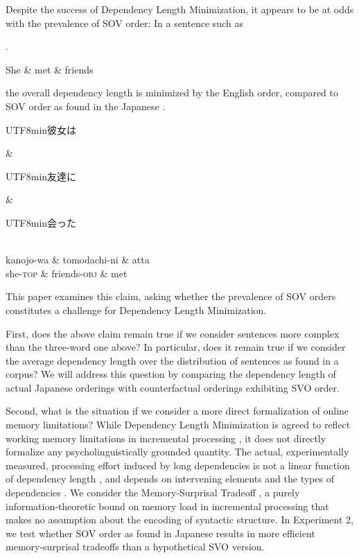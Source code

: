 \documentclass[11pt,a4paper]{article}
\newcommand{\japanese}[1]{\begin{CJK}{UTF8}{min}#1\end{CJK}}
\begin{document}
Despite the success of Dependency Length Minimization, it appears to be at odds with the prevalence of SOV order: In a sentence such as

\ex.
\begin{dependency}[theme = simple]
   \begin{deptext}[column sep=1em]
          She \& met \& friends  \\
   \end{deptext}
\end{dependency}

the overall dependency length is minimized by the English order, compared to SOV order as found in the Japanese
\ex.
\begin{dependency}[theme = simple]
   \begin{deptext}[column sep=1em]
          \japanese{彼女は} \& \japanese{友達に} \& \japanese{会った}  \\
          kanojo-wa \& tomodachi-ni \& atta \\ 
          she-\textsc{top} \& friends-\textsc{obj} \& met \\
   \end{deptext}
\end{dependency}


This paper examines this claim, asking whether the prevalence of SOV orders constitutes a challenge for Dependency Length Minimization.

First, does the above claim remain true if we consider sentences more complex than the three-word one above?
In particular, does it remain true if we consider the average dependency length over the distribution of sentences as found in a corpus?
We will address this question by comparing the dependency length of actual Japanese orderings with counterfactual orderings exhibiting SVO order.


Second, what is the situation if we consider a more direct formalization of online memory limitations?
While Dependency Length Minimization is agreed to reflect working memory limitations in incremental processing \citep{hawkins1994performance, futrell2015largescale, temperley2018minimizing}, it does not directly formalize any psycholinguistically grounded quantity.
The actual, experimentally measured, processing effort induced by long dependencies is not a linear function of dependency length \citep{gibson1998linguistic}, and depends on intervening elements \citep{gibson1998linguistic, lewis-activation-based-2005} and the types of dependencies \citep{demberg-data-2008}.
We consider the Memory-Surprisal Tradeoff \citep{hahn2019memory}, a purely information-theoretic bound on memory load in incremental processing that makes no assumption about the encoding of syntactic structure.
In Experiment 2, we test whether SOV order as found in Japanese results in more efficient memory-surprisal tradeoffs than a hypothetical SVO version.
\end{document}
